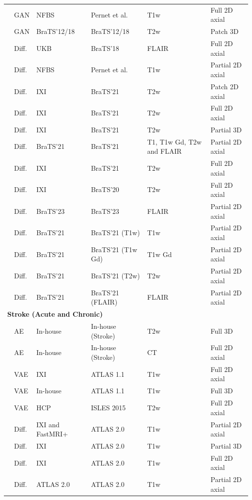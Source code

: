 \begin{longtable}{p{4.2cm}p{1.3cm}p{3.2cm}p{3cm}p{4cm}p{3.3cm}}
\citet{Nguyen2021} & GAN & NFBS & Pernet et al. & T1w & Full 2D axial \\
\citet{Wu2021} & GAN & BraTS'12/18 & BraTS'12/18 & T2w & Patch 3D \\
\citet{Pinaya2022-1} & Diff. & UKB &  BraTS'18 & FLAIR & Full 2D axial\\
\citet{Wyatt2022} & Diff. & NFBS & Pernet et al. & T1w &  Partial 2D axial \\
\citet{Behrendt2023} & Diff. & IXI & BraTS'21 & T2w & Patch 2D axial \\
\citet{Iqbal2023} & Diff. & IXI & BraTS'21 & T2w & Full 2D axial \\
\citet{Behrendt2024} & Diff. & IXI & BraTS'21 & T2w & Partial 3D \\
\citet{Fontanella2024} & Diff. & BraTS'21 & BraTS'21 & T1, T1w Gd, T2w and FLAIR & Partial 2D axial \\
\citet{Kumar2024} & Diff. & IXI & BraTS'21 & T2w & Full 2D axial \\
\citet{Kumar2024} & Diff. & IXI & BraTS'20 & T2w & Full 2D axial \\
\citet{Bi2025} & Diff. & BraTS'23 & BraTS'23 & FLAIR & Partial 2D axial \\
\citet{Beizaee2026} & Diff. & BraTS'21 & BraTS'21 (T1w)& T1w & Partial 2D axial\\
\citet{Beizaee2026} & Diff. & BraTS'21 & BraTS'21 (T1w Gd)& T1w Gd & Partial 2D axial\\
\citet{Beizaee2026} & Diff. & BraTS'21 & BraTS'21 (T2w)& T2w & Partial 2D axial\\
\citet{Beizaee2026} & Diff. & BraTS'21 & BraTS'21 (FLAIR)& FLAIR & Partial 2D axial\\

\hline

\multicolumn{6}{l}{\textbf{Stroke (Acute and Chronic)}} \\
\midrule
\citet{Luo2023} & AE & In-house & In-house (Stroke)  & T2w & Full 3D \\
\citet{Qu2026} & AE & In-house & In-house (Stroke) & CT & Full 2D axial\\
\citet{Sato2019} & VAE & IXI & ATLAS 1.1 & T1w & Full 2D axial\\
\citet{Bengs2021} & VAE & In-house & ATLAS 1.1 & T1w & Full 3D \\
\citet{Lüth2023} & VAE & HCP & ISLES 2015 & T2w & Full 2D axial \\
\citet{Bercea2023} & Diff. & IXI and FastMRI+ & ATLAS 2.0 & T1w & Partial 2D axial \\
\citet{Behrendt2024} & Diff. & IXI & ATLAS 2.0 & T1w & Partial 3D \\
\citet{Bercea2024} & Diff. & IXI & ATLAS 2.0 & T1w & Full 2D axial \\
\citet{Beizaee2026} & Diff. & ATLAS 2.0 & ATLAS 2.0 & T1w & Partial 2D axial\\
\hline


\end{longtable}

